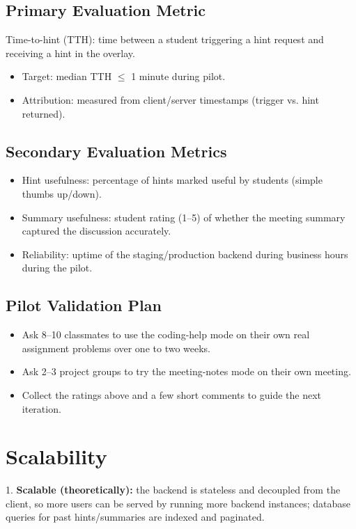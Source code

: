 \documentclass[11pt]{article}
\begin{document}
\subsection{Primary Evaluation Metric}
Time-to-hint (TTH): time between a student triggering a hint request and receiving a hint in
the overlay.
\begin{itemize}
  \item Target: median TTH $\leq$ 1 minute during pilot.
  \item Attribution: measured from client/server timestamps (trigger vs. hint returned).
\end{itemize}

\subsection{Secondary Evaluation Metrics}
\begin{itemize}
  \item Hint usefulness: percentage of hints marked useful by students (simple thumbs
    up/down).
  \item Summary usefulness: student rating (1--5) of whether the meeting summary captured
    the discussion accurately.
  \item Reliability: uptime of the staging/production backend during business hours during
    the pilot.
\end{itemize}

\subsection{Pilot Validation Plan}
\begin{itemize}
  \item Ask 8--10 classmates to use the coding-help mode on their own real assignment
    problems over one to two weeks.
  \item Ask 2--3 project groups to try the meeting-notes mode on their own meeting.
  \item Collect the ratings above and a few short comments to guide the next iteration.
\end{itemize}

\section{Scalability}
1. \textbf{Scalable (theoretically):} the backend is stateless and decoupled from the
client, so more users can be served by running more backend instances; database queries for
past hints/summaries are indexed and paginated.
\end{document}
